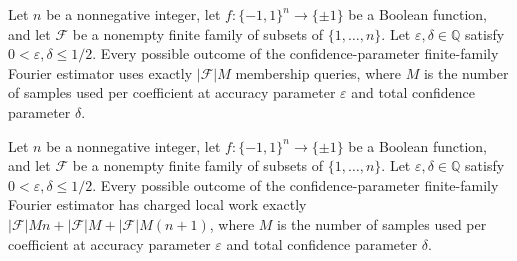 \begin{theorem}
\label{FABL.queriedFiniteFamilyFourierEstimatorProgramWithConfidence_queries_eq}
\leanok
{}
Let $n$ be a nonnegative integer, let $f:\{-1,1\}^n\to\{\pm1\}$ be a Boolean function,
and let $\mathcal F$ be a nonempty finite family of subsets of $\{1,\ldots,n\}$. Let
$\varepsilon,\delta\in\mathbb Q$ satisfy $0<\varepsilon,\delta\le 1/2$. Every possible
outcome of the confidence-parameter finite-family Fourier estimator uses exactly
$|\mathcal F|M$ membership queries, where $M$ is the number of samples used per
coefficient at accuracy parameter $\varepsilon$ and total confidence parameter $\delta$.
\end{theorem}

\begin{theorem}
\label{FABL.queriedFiniteFamilyFourierEstimatorProgramWithConfidence_work_eq}
\leanok
{}
Let $n$ be a nonnegative integer, let $f:\{-1,1\}^n\to\{\pm1\}$ be a Boolean function,
and let $\mathcal F$ be a nonempty finite family of subsets of $\{1,\ldots,n\}$. Let
$\varepsilon,\delta\in\mathbb Q$ satisfy $0<\varepsilon,\delta\le 1/2$. Every possible
outcome of the confidence-parameter finite-family Fourier estimator has charged local
work exactly $|\mathcal F|Mn+|\mathcal F|M+|\mathcal F|M(n+1)$, where $M$ is the number
of samples used per coefficient at accuracy parameter $\varepsilon$ and total confidence
parameter $\delta$.
\end{theorem}

